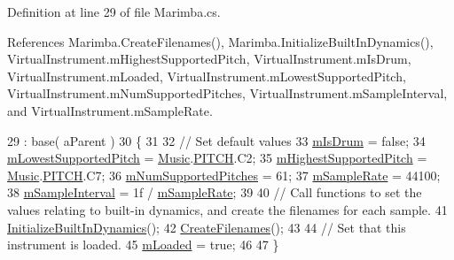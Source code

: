 Definition at line 29 of file Marimba.\+cs.



References Marimba.\+Create\+Filenames(), Marimba.\+Initialize\+Built\+In\+Dynamics(), Virtual\+Instrument.\+m\+Highest\+Supported\+Pitch, Virtual\+Instrument.\+m\+Is\+Drum, Virtual\+Instrument.\+m\+Loaded, Virtual\+Instrument.\+m\+Lowest\+Supported\+Pitch, Virtual\+Instrument.\+m\+Num\+Supported\+Pitches, Virtual\+Instrument.\+m\+Sample\+Interval, and Virtual\+Instrument.\+m\+Sample\+Rate.


\begin{DoxyCode}
29                                                        : base( aParent )
30     \{
31 
32         \textcolor{comment}{// Set default values}
33         \hyperlink{group___v_i_base_pro_var_ga47dbd8aa02ab32b8f802adfd2d3d81de}{mIsDrum} = \textcolor{keyword}{false};
34         \hyperlink{group___v_i_base_pro_var_ga3cae52b1bcc0178a8a6b03c7aaf7aac8}{mLowestSupportedPitch} = \hyperlink{class_music}{Music}.\hyperlink{group___music_enums_ga508f69b199ea518f935486c990edac1d}{PITCH}.C2;
35         \hyperlink{group___v_i_base_pro_var_ga61fb2c33b53a0f663047779d7ceb18f3}{mHighestSupportedPitch} = \hyperlink{class_music}{Music}.\hyperlink{group___music_enums_ga508f69b199ea518f935486c990edac1d}{PITCH}.C7;
36         \hyperlink{group___v_i_base_pro_var_gafc759a16324cf9b3f230bcbf040afcd2}{mNumSupportedPitches} = 61;
37         \hyperlink{group___v_i_base_pro_var_ga80b3d2ff29b27698eea6bcf2f8ddc5d7}{mSampleRate} = 44100;
38         \hyperlink{group___v_i_base_pro_var_ga20c1d3d25ea666378d72c833d160ae2e}{mSampleInterval} = 1f / \hyperlink{group___v_i_base_pro_var_ga80b3d2ff29b27698eea6bcf2f8ddc5d7}{mSampleRate};
39 
40         \textcolor{comment}{// Call functions to set the values relating to built-in dynamics, and create the filenames for
       each sample.}
41         \hyperlink{group___mar_virt_func_ga293d829cb8571c21452c23e90968b2d8}{InitializeBuiltInDynamics}();
42         \hyperlink{group___mar_virt_func_gae57d9737fd07708dc7e13e74ee777878}{CreateFilenames}();
43 
44         \textcolor{comment}{// Set that this instrument is loaded.}
45         \hyperlink{group___v_i_base_pro_var_ga8978807d1878db5aae91fbd057c46097}{mLoaded} = \textcolor{keyword}{true};
46 
47     \}
\end{DoxyCode}
